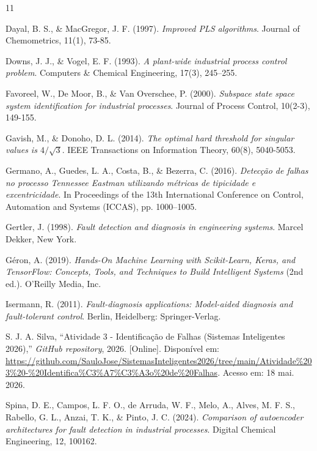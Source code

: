 \documentclass[journal]{IEEEtran}
\begin{document}
\begin{thebibliography}{11}

Dayal, B. S., \& MacGregor, J. F. (1997).
\textit{Improved PLS algorithms}.
Journal of Chemometrics, 11(1), 73-85.

Downs, J. J., \& Vogel, E. F. (1993).
\textit{A plant-wide industrial process control problem}.
Computers \& Chemical Engineering, 17(3), 245--255.

Favoreel, W., De Moor, B., \& Van Overschee, P. (2000).
\textit{Subspace state space system identification for industrial processes}.
Journal of Process Control, 10(2-3), 149-155.

Gavish, M., \& Donoho, D. L. (2014).
\textit{The optimal hard threshold for singular values is $4/\sqrt{3}$}.
IEEE Transactions on Information Theory, 60(8), 5040-5053.

Germano, A., Guedes, L. A., Costa, B., \& Bezerra, C. (2016).
\textit{Detecção de falhas no processo Tennessee Eastman utilizando métricas de tipicidade e excentricidade}.
In Proceedings of the 13th International Conference on Control, Automation and Systems (ICCAS), pp. 1000--1005.

Gertler, J. (1998).
\textit{Fault detection and diagnosis in engineering systems}.
Marcel Dekker, New York.

Géron, A. (2019).
\textit{Hands-On Machine Learning with Scikit-Learn, Keras, and TensorFlow: Concepts, Tools, and Techniques to Build Intelligent Systems} (2nd ed.).
O'Reilly Media, Inc.

Isermann, R. (2011).
\textit{Fault-diagnosis applications: Model-aided diagnosis and fault-tolerant control}.
Berlin, Heidelberg: Springer-Verlag.

S. J. A. Silva, ``Atividade 3 - Identificação de Falhas (Sistemas Inteligentes 2026),'' \textit{GitHub repository}, 2026. [Online]. Disponível em: \url{https://github.com/SauloJose/SistemasInteligentes2026/tree/main/Atividade%203%20-%20Identifica%C3%A7%C3%A3o%20de%20Falhas}. Acesso em: 18 mai. 2026.

Spina, D. E., Campos, L. F. O., de Arruda, W. F., Melo, A., Alves, M. F. S., Rabello, G. L., Anzai, T. K., \& Pinto, J. C. (2024).
\textit{Comparison of autoencoder architectures for fault detection in industrial processes}.
Digital Chemical Engineering, 12, 100162.


\end{thebibliography}
\end{document}

